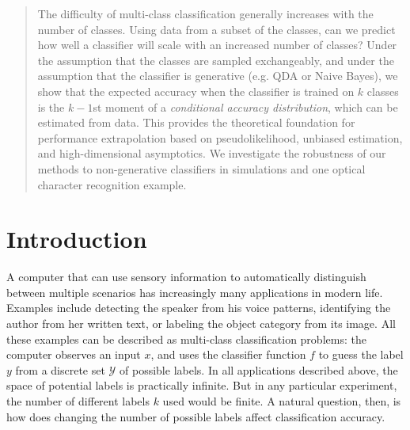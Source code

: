 \documentclass[12pt]{article}
\begin{document}
\maketitle

\newcommand{\skone}{\mathcal{S}_{k_1}}
\newcommand{\sktwo}{\mathcal{S}_{k_2}}

\newcommand{\tr}{\text{tr}}
\newcommand{\E}{\textbf{E}}
\newcommand{\diag}{\text{diag}}
\newcommand{\argmax}{\text{argmax}}
\newcommand{\Cov}{\text{Cov}}
\newcommand{\Var}{\text{Var}}
\newcommand{\argmin}{\text{argmin}}
\newcommand{\Vol}{\text{Vol}}
\newcommand{\comm}[1]{}
\newcommand{\indep}{\rotatebox[origin=c]{90}{$\models$}}
\newcommand{\Cor}{\text{Cor}}
\newtheorem{theorem}{Theorem}[section]
\newtheorem{proposition}{Proposition}[section]
\newtheorem{corollary}{Corollary}[theorem]
\newtheorem{lemma}{Lemma}[section]
\newtheorem{definition}{Definition}[section]
\newcommand{\bZ}{\boldsymbol{Z}}
\newcommand{\bz}{\boldsymbol{z}}
\newcommand{\bx}{\boldsymbol{x}}
\newcommand{\bX}{\boldsymbol{X}}


\begin{abstract}
The difficulty of multi-class classification generally increases with
the number of classes.  Using data from a subset of the classes, can
we predict how well a classifier will scale with an increased number
of classes?  Under the assumption that the classes are sampled
exchangeably, and under the assumption that the classifier is
generative (e.g. QDA or Naive Bayes), we show that the expected
accuracy when the classifier is trained on $k$ classes is the $k-1$st
moment of a \emph{conditional accuracy distribution}, which can be
estimated from data.  This provides the theoretical foundation for
performance extrapolation based on pseudolikelihood, unbiased
estimation, and high-dimensional asymptotics.  We investigate the
robustness of our methods to non-generative classifiers in simulations
and one optical character recognition example.
\end{abstract}

\section{Introduction}
A computer that can use sensory information to automatically
 distinguish between multiple scenarios has increasingly many applications
 in modern life. Examples include detecting the speaker from his voice patterns, 
identifying the author from her written text, or labeling the object 
category from its image. All these examples can be described as multi-class classification problems:
the computer observes an input $x$, and uses the classifier function $f$ to guess
the label $y$ from a discrete set $\mathcal{Y}$ of possible labels. 
In all applications described above, the space of potential labels is practically infinite.
But in any particular experiment, the number of different labels $k$ used would be finite.
A natural question, then, is how does changing the number of 
possible labels affect classification accuracy. 
\end{document}
